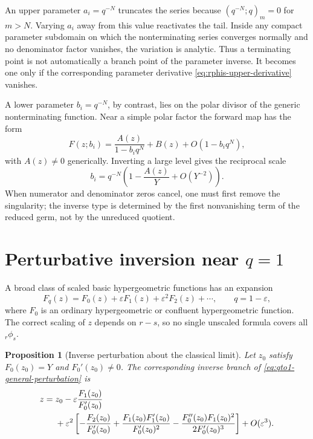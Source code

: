 \documentclass[11pt,a4paper,oneside,openany]{book}
\newtheorem{proposition}[theorem]{Proposition}
\theoremstyle{definition}
\theoremstyle{remark}
\newcommand{\eps}{\varepsilon}
\begin{document}
An upper parameter \(a_i=q^{-N}\) truncates the series because
\((q^{-N};q)_m=0\) for \(m>N\).  Varying \(a_i\) away from this value
reactivates the tail.  Inside any compact parameter subdomain on which the
nonterminating series converges normally and no denominator factor vanishes,
the variation is analytic.  Thus a terminating point is not automatically a branch
point of the parameter inverse.  It becomes one only if the corresponding
parameter derivative \eqref{eq:rphis-upper-derivative} vanishes.

A lower parameter \(b_i=q^{-N}\), by contrast, lies on the polar divisor of
the generic nonterminating function.  Near a simple polar factor the forward
map has the form
\begin{equation}\label{eq:rphis-lower-pole-model}
 F(z;b_i)=\frac{A(z)}{1-b_iq^N}+B(z)+O(1-b_iq^N),
\end{equation}
with \(A(z)\ne0\) generically.  Inverting a large level gives the reciprocal
scale
\begin{equation}\label{eq:rphis-lower-pole-inverse}
 b_i=q^{-N}\left(1-\frac{A(z)}{Y}+O(Y^{-2})\right).
\end{equation}
When numerator and denominator zeros cancel, one must first remove the
singularity; the inverse type is determined by the first nonvanishing term of
the reduced germ, not by the unreduced quotient.

\section{Perturbative inversion near \texorpdfstring{$q=1$}{q=1}}

A broad class of scaled basic hypergeometric functions has an expansion
\begin{equation}\label{eq:qto1-general-perturbation}
 F_q(z)=F_0(z)+\eps F_1(z)+\eps^2F_2(z)+\cdots,
 \qquad q=1-\eps,
\end{equation}
where \(F_0\) is an ordinary hypergeometric or confluent hypergeometric
function.  The correct scaling of \(z\) depends on \(r-s\), so no single
unscaled formula covers all \({}_r\phi_s\).

\begin{proposition}[Inverse perturbation about the classical limit]
\label{prop:inverse-perturbation-qone}
Let \(z_0\) satisfy \(F_0(z_0)=Y\) and \(F_0'(z_0)\ne0\).  The corresponding
inverse branch of \eqref{eq:qto1-general-perturbation} is
\begin{align}
 z={}&z_0-\eps\frac{F_1(z_0)}{F_0'(z_0)} \notag\\
 &+\eps^2\left[
 -\frac{F_2(z_0)}{F_0'(z_0)}
 +\frac{F_1(z_0)F_1'(z_0)}{F_0'(z_0)^2}
 -\frac{F_0''(z_0)F_1(z_0)^2}{2F_0'(z_0)^3}
 \right]+O(\eps^3).
 \label{eq:inverse-perturbation-qone}
\end{align}
\end{proposition}
\end{document}
